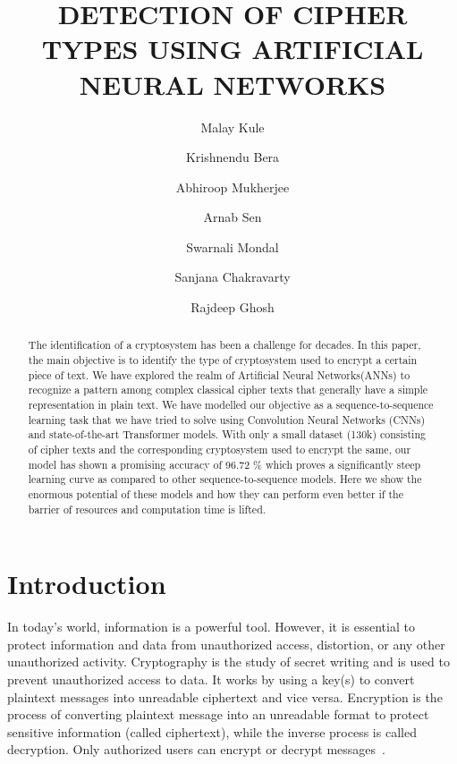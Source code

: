 \documentclass[runningheads]{llncs}
\begin{document}
%
\title{DETECTION OF CIPHER TYPES USING ARTIFICIAL NEURAL NETWORKS
}
%
%

\author{Malay Kule\and
Krishnendu Bera\and
Abhiroop Mukherjee\and
Arnab Sen\and
Swarnali Mondal\and
Sanjana Chakravarty\and
Rajdeep Ghosh}
%
%
%
\maketitle              %
%
\begin{abstract}
The identification of a cryptosystem has been a challenge for decades. In this paper, the main objective is to identify the type of cryptosystem used to encrypt a certain piece of text. We have explored the realm of Artificial Neural Networks(ANNs) to recognize a pattern among complex classical cipher texts that generally have a simple representation in plain text. We have modelled our objective as a sequence-to-sequence learning task that we have tried to solve using Convolution Neural Networks (CNNs) and state-of-the-art Transformer models. With only a small dataset (130k) consisting of cipher texts and the corresponding cryptosystem used to encrypt the same, our model has shown a promising accuracy of 96.72 \% which proves a significantly steep learning curve as compared to other sequence-to-sequence models. Here we show the enormous potential of these models and how they can perform even better if the barrier of resources and computation time is lifted.


\end{abstract}
%
%
\section{Introduction}
In today's world, information is a powerful tool. However, it is essential to protect information and data from unauthorized access, distortion, or any other unauthorized activity. Cryptography is the study of secret writing and is used to prevent unauthorized access to data. It works by using a key(s) to convert plaintext messages into unreadable ciphertext and vice versa. Encryption is the process of converting plaintext message into an unreadable format to protect sensitive information (called ciphertext), while the inverse process is called decryption. Only authorized users can encrypt or decrypt messages~\cite{katz2020introduction}.
\end{document}
